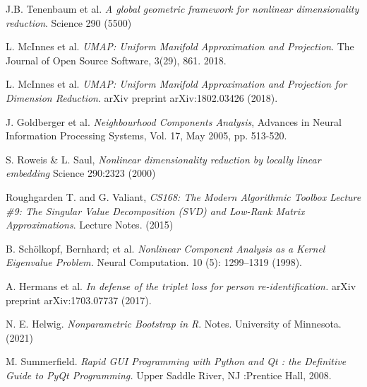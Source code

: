 \documentclass[11pt, a4paper, twoside]{article} %
\begin{document}
\begin{thebibliography}{1}
J.B. Tenenbaum et al. {\em A global geometric framework for nonlinear dimensionality reduction}.  Science 290 (5500)


L. McInnes et al. {\em UMAP: Uniform Manifold Approximation and Projection}. The Journal of Open Source Software, 3(29), 861. 2018.

L. McInnes et al. {\em UMAP: Uniform Manifold Approximation and Projection for Dimension Reduction}. arXiv preprint arXiv:1802.03426 (2018).

J. Goldberger et al. {\em Neighbourhood Components Analysis}, Advances in Neural Information Processing Systems, Vol. 17, May 2005, pp. 513-520.

S. Roweis \& L. Saul, {\em Nonlinear dimensionality reduction by locally linear embedding} Science 290:2323 (2000)

Roughgarden T. and G. Valiant, {\em CS168: The Modern Algorithmic Toolbox Lecture \#9: The Singular Value Decomposition (SVD) and Low-Rank Matrix Approximations}. Lecture Notes. (2015)

B. Schölkopf, Bernhard; et al. {\em Nonlinear Component Analysis as a Kernel Eigenvalue Problem.} Neural Computation. 10 (5): 1299–1319 (1998).

A. Hermans et al. {\em In defense of the triplet loss for person re-identification.} arXiv preprint arXiv:1703.07737 (2017).

N. E. Helwig. {\em Nonparametric Bootstrap in R}. Notes. University of Minnesota. (2021)

M. Summerfield. {\em Rapid GUI Programming with Python and Qt : the Definitive Guide to PyQt Programming.} Upper Saddle River, NJ :Prentice Hall, 2008.




\end{thebibliography}
\end{document}
